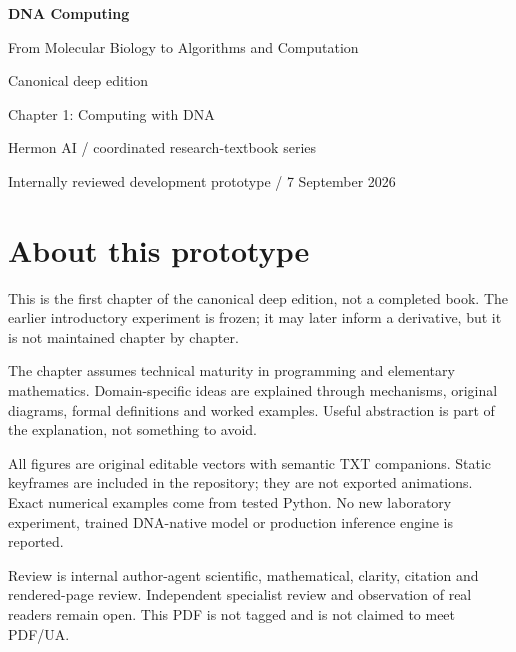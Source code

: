 \documentclass[11pt,oneside,openany]{book}
\begin{document}
\frontmatter
\begin{titlepage}
\color{BookBlue}\sffamily
\vspace*{18mm}
{\Huge\bfseries DNA Computing\par}
\vspace{8mm}
{\Large From Molecular Biology to Algorithms and Computation\par}
\vspace{20mm}
{\large Canonical deep edition\par}
\vspace{5mm}
{\LARGE Chapter 1: Computing with DNA\par}
\vfill
{\normalsize Hermon AI / coordinated research-textbook series\par}
\vspace{6mm}
{\small Internally reviewed development prototype / 7 September 2026\par}
\end{titlepage}
\chapter*{About this prototype}
This is the first chapter of the canonical deep edition, not a completed book. The earlier introductory experiment is frozen; it may later inform a derivative, but it is not maintained chapter by chapter.

The chapter assumes technical maturity in programming and elementary mathematics. Domain-specific ideas are explained through mechanisms, original diagrams, formal definitions and worked examples. Useful abstraction is part of the explanation, not something to avoid.

All figures are original editable vectors with semantic TXT companions. Static keyframes are included in the repository; they are not exported animations. Exact numerical examples come from tested Python. No new laboratory experiment, trained DNA-native model or production inference engine is reported.

Review is internal author-agent scientific, mathematical, clarity, citation and rendered-page review. Independent specialist review and observation of real readers remain open. This PDF is not tagged and is not claimed to meet PDF/UA.
\tableofcontents
\mainmatter

\backmatter


\clearpage{}
{}
\printindex
\end{document}
